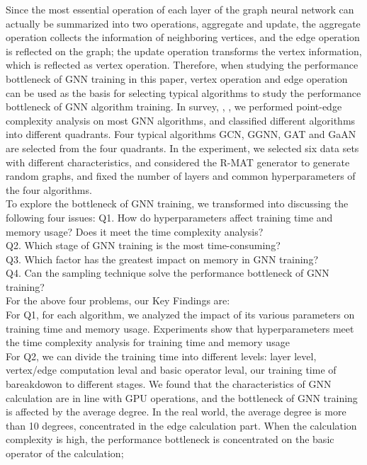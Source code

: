 Since the most essential operation of each layer of the graph neural network can actually be summarized into two operations,
aggregate and update, the aggregate operation collects the information of neighboring vertices, 
and the edge operation is reflected on the graph; the update operation transforms the vertex information, 
which is reflected as vertex operation. Therefore, when studying the performance bottleneck of GNN training in this paper,
vertex operation and edge operation can be used as the basis for selecting typical algorithms to
study the performance bottleneck of GNN algorithm training. In survey\cite{comprehensive-survey-wu-2020}, \cite{zhou2018_gnn_review}, \cite{zhang2018_gnn_survey}, 
we performed point-edge complexity analysis on most GNN algorithms, and classified different algorithms into different quadrants. 
Four typical algorithms GCN, GGNN, GAT and GaAN are selected from the four quadrants. 
In the experiment, we selected six data sets with different characteristics, and considered the R-MAT generator to generate random graphs, 
and fixed the number of layers and common hyperparameters of the four algorithms. \\
To explore the bottleneck of GNN training, we transformed into discussing the following four issues:
Q1. How do hyperparameters affect training time and memory usage? Does it meet the time complexity analysis?\\
Q2. Which stage of GNN training is the most time-consuming?\\
Q3. Which factor has the greatest impact on memory in GNN training?\\
Q4. Can the sampling technique solve the performance bottleneck of GNN training?\\
For the above four problems, our Key Findings are:\\
For Q1, for each algorithm, we analyzed the impact of its various parameters on training time and memory usage. 
Experiments show that hyperparameters meet the time complexity analysis for training time and memory usage \\
For Q2, we can divide the training time into different levels: layer level, vertex/edge computation leval 
and basic operator leval, our training time of bareakdowon to different stages. We found that the characteristics of GNN
calculation are in line with GPU operations, and the bottleneck of GNN training is affected by the average degree.
In the real world, the average degree is more than 10 degrees, concentrated in the edge calculation part. 
When the calculation complexity is high, the performance bottleneck is concentrated on the basic operator of the calculation; 
